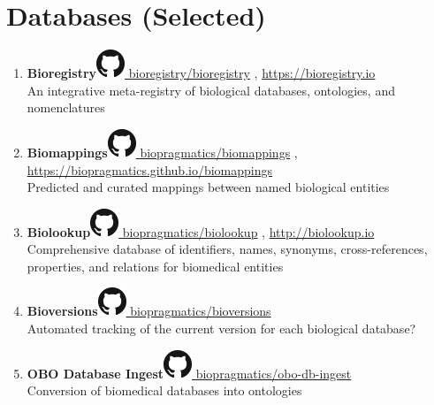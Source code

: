 \documentclass[10pt,a4paper,sans]{moderncv} %
\begin{document}
    \section{Databases (Selected)}\label{sec:databases}
    \begin{enumerate}
    \itemsep0.5em
        \item \textbf{Bioregistry}\hfill\href{https://github.com/bioregistry/bioregistry}{\includegraphics[scale=0.25]{img/GitHub-Mark-32px} bioregistry/bioregistry}
, \url{https://bioregistry.io}\\
    An integrative meta-registry of biological databases, ontologies, and nomenclatures

        \item \textbf{Biomappings}\hfill\href{https://github.com/biopragmatics/biomappings}{\includegraphics[scale=0.25]{img/GitHub-Mark-32px} biopragmatics/biomappings}
, \url{https://biopragmatics.github.io/biomappings}\\
    Predicted and curated mappings between named biological entities

        \item \textbf{Biolookup}\hfill\href{https://github.com/biopragmatics/biolookup}{\includegraphics[scale=0.25]{img/GitHub-Mark-32px} biopragmatics/biolookup}
, \url{http://biolookup.io}\\
    Comprehensive database of identifiers, names, synonyms, cross-references, properties, and relations for biomedical entities

        \item \textbf{Bioversions}\hfill\href{https://github.com/biopragmatics/bioversions}{\includegraphics[scale=0.25]{img/GitHub-Mark-32px} biopragmatics/bioversions}
\\
    Automated tracking of the current version for each biological database?

        \item \textbf{OBO Database Ingest}\hfill\href{https://github.com/biopragmatics/obo-db-ingest}{\includegraphics[scale=0.25]{img/GitHub-Mark-32px} biopragmatics/obo-db-ingest}
\\
    Conversion of biomedical databases into ontologies


\end{enumerate}
\end{document}
